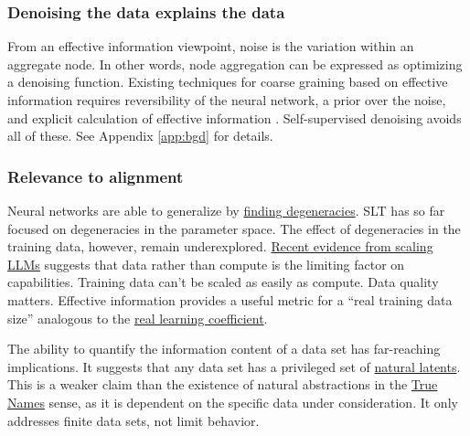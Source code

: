 \subsubsection{Denoising the data explains the data}
From an effective information viewpoint, noise is the variation within an aggregate node.
In other words, node aggregation can be expressed as optimizing a denoising function.
Existing techniques for coarse graining based on effective information requires reversibility of the 
neural network, a prior over the noise, and explicit calculation of effective information
\cite{e25010026}. Self-supervised denoising avoids all of these.
See Appendix \ref{app:bgd} for details.

\subsubsection{Relevance to alignment}
Neural networks are able to generalize by
\hyperlink{https://www.lesswrong.com/s/mqwA5FcL6SrHEQzox/p/fovfuFdpuEwQzJu2w}{finding degeneracies}.
SLT has so far focused on degeneracies in the parameter space.
The effect of degeneracies in the training data, however, remain underexplored.
\hyperlink{https://www.lesswrong.com/posts/6Fpvch8RR29qLEWNH/chinchilla-s-wild-implications}{Recent evidence from scaling LLMs}
suggests that data rather than compute is the limiting factor on capabilities.
Training data can't be scaled as easily as compute. Data quality matters. 
Effective information provides a useful metric for a ``real training data size'' analogous to the
\hyperlink{https://www.lesswrong.com/posts/6g8cAftfQufLmFDYT/you-re-measuring-model-complexity-wrong}{real learning coefficient}.

The ability to quantify the information content of a data set has far-reaching implications.
It suggests that any data set has a privileged set of
\hyperlink{https://www.lesswrong.com/posts/dWQWzGCSFj6GTZHz7/natural-latents-the-math}{natural latents}.
This is a weaker claim than the existence of natural abstractions in the
\hyperlink{https://www.lesswrong.com/posts/FWvzwCDRgcjb9sigb/why-agent-foundations-an-overly-abstract-explanation}{True Names}
sense, as it is dependent on the specific data under consideration.
It only addresses finite data sets, not limit behavior.


